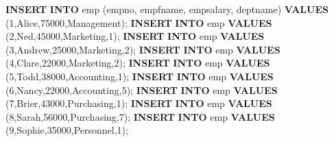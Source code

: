 \documentclass[
]{article}
\newenvironment{Shaded}{\begin{snugshade}}{\end{snugshade}}
\newcommand{\DecValTok}[1]{\textcolor[rgb]{0.00,0.00,0.81}{#1}}
\newcommand{\KeywordTok}[1]{\textcolor[rgb]{0.13,0.29,0.53}{\textbf{#1}}}
\newcommand{\NormalTok}[1]{#1}
\newcommand{\StringTok}[1]{\textcolor[rgb]{0.31,0.60,0.02}{#1}}
\begin{document}
\begin{Shaded}
\begin{Highlighting}[]
\KeywordTok{INSERT} \KeywordTok{INTO}\NormalTok{ emp (empno, empfname, empsalary, deptname) }\KeywordTok{VALUES}\NormalTok{ (}\DecValTok{1}\NormalTok{,}\StringTok{\textquotesingle{}Alice\textquotesingle{}}\NormalTok{,}\DecValTok{75000}\NormalTok{,}\StringTok{\textquotesingle{}Management\textquotesingle{}}\NormalTok{);}
\KeywordTok{INSERT} \KeywordTok{INTO}\NormalTok{ emp }\KeywordTok{VALUES}\NormalTok{ (}\DecValTok{2}\NormalTok{,}\StringTok{\textquotesingle{}Ned\textquotesingle{}}\NormalTok{,}\DecValTok{45000}\NormalTok{,}\StringTok{\textquotesingle{}Marketing\textquotesingle{}}\NormalTok{,}\DecValTok{1}\NormalTok{);}
\KeywordTok{INSERT} \KeywordTok{INTO}\NormalTok{ emp }\KeywordTok{VALUES}\NormalTok{ (}\DecValTok{3}\NormalTok{,}\StringTok{\textquotesingle{}Andrew\textquotesingle{}}\NormalTok{,}\DecValTok{25000}\NormalTok{,}\StringTok{\textquotesingle{}Marketing\textquotesingle{}}\NormalTok{,}\DecValTok{2}\NormalTok{);}
\KeywordTok{INSERT} \KeywordTok{INTO}\NormalTok{ emp }\KeywordTok{VALUES}\NormalTok{ (}\DecValTok{4}\NormalTok{,}\StringTok{\textquotesingle{}Clare\textquotesingle{}}\NormalTok{,}\DecValTok{22000}\NormalTok{,}\StringTok{\textquotesingle{}Marketing\textquotesingle{}}\NormalTok{,}\DecValTok{2}\NormalTok{);}
\KeywordTok{INSERT} \KeywordTok{INTO}\NormalTok{ emp }\KeywordTok{VALUES}\NormalTok{ (}\DecValTok{5}\NormalTok{,}\StringTok{\textquotesingle{}Todd\textquotesingle{}}\NormalTok{,}\DecValTok{38000}\NormalTok{,}\StringTok{\textquotesingle{}Accounting\textquotesingle{}}\NormalTok{,}\DecValTok{1}\NormalTok{);}
\KeywordTok{INSERT} \KeywordTok{INTO}\NormalTok{ emp }\KeywordTok{VALUES}\NormalTok{ (}\DecValTok{6}\NormalTok{,}\StringTok{\textquotesingle{}Nancy\textquotesingle{}}\NormalTok{,}\DecValTok{22000}\NormalTok{,}\StringTok{\textquotesingle{}Accounting\textquotesingle{}}\NormalTok{,}\DecValTok{5}\NormalTok{);}
\KeywordTok{INSERT} \KeywordTok{INTO}\NormalTok{ emp }\KeywordTok{VALUES}\NormalTok{ (}\DecValTok{7}\NormalTok{,}\StringTok{\textquotesingle{}Brier\textquotesingle{}}\NormalTok{,}\DecValTok{43000}\NormalTok{,}\StringTok{\textquotesingle{}Purchasing\textquotesingle{}}\NormalTok{,}\DecValTok{1}\NormalTok{);}
\KeywordTok{INSERT} \KeywordTok{INTO}\NormalTok{ emp }\KeywordTok{VALUES}\NormalTok{ (}\DecValTok{8}\NormalTok{,}\StringTok{\textquotesingle{}Sarah\textquotesingle{}}\NormalTok{,}\DecValTok{56000}\NormalTok{,}\StringTok{\textquotesingle{}Purchasing\textquotesingle{}}\NormalTok{,}\DecValTok{7}\NormalTok{);}
\KeywordTok{INSERT} \KeywordTok{INTO}\NormalTok{ emp }\KeywordTok{VALUES}\NormalTok{ (}\DecValTok{9}\NormalTok{,}\StringTok{\textquotesingle{}Sophie\textquotesingle{}}\NormalTok{,}\DecValTok{35000}\NormalTok{,}\StringTok{\textquotesingle{}Personnel\textquotesingle{}}\NormalTok{,}\DecValTok{1}\NormalTok{);}
\end{Highlighting}
\end{Shaded}
\end{document}
